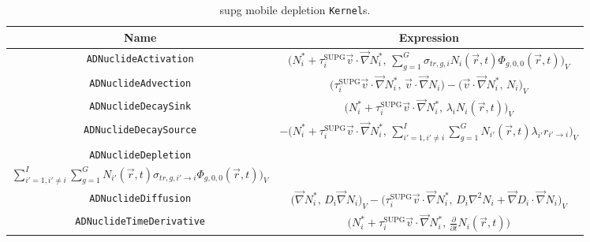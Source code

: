 \begin{table}[H]
    \centering
    \caption{\acrshort{supg} mobile depletion \texttt{Kernel}s.}
    \begin{tabular}{|c|c|}
        \hline
        \textbf{Name} & \textbf{Expression}\\
        \hline
        \texttt{ADNuclideActivation} & $\Bigg(N^{*}_{i} + \tau^{\text{SUPG}}_{i}\vec{v}\cdot\vec{\nabla}N^{*}_{i},\,\sum_{g = 1}^{G}\sigma_{tr,g,i}N_{i}(\vec{r},t)\Phi_{g, 0, 0}(\vec{r},t)\Bigg)_{V}$ \\
        \texttt{ADNuclideAdvection} & $\Bigg(\tau_{i}^{\text{SUPG}}\vec{v}\cdot\vec{\nabla}N^{*}_{i},\,\vec{v}\cdot\vec{\nabla}N_{i}\Bigg) - \Bigg(\vec{v}\cdot\vec{\nabla}N_{i}^{*},\,N_{i}\Bigg)_{V}$ \\
        \texttt{ADNuclideDecaySink} & $\Bigg(N^{*}_{i} + \tau^{\text{SUPG}}_{i}\vec{v}\cdot\vec{\nabla}N^{*}_{i},\,\lambda_{i}N_{i}(\vec{r},t)\Bigg)_{V}$ \\
        \texttt{ADNuclideDecaySource} & $-\Bigg(N^{*}_{i} + \tau^{\text{SUPG}}_{i}\vec{v}\cdot\vec{\nabla}N^{*}_{i},\,\sum_{i' = 1,i' \neq i}^{I}\sum_{g = 1}^{G}N_{i'}(\vec{r},t)\lambda_{i'}r_{i'\rightarrow i}\Bigg)_{V}$ \\
        \texttt{ADNuclideDepletion} & \makecell{$-\Bigg(N^{*}_{i} + \tau^{\text{SUPG}}_{i}\vec{v}\cdot\vec{\nabla}N^{*}_{i},$ \\ $\sum_{i' = 1,i' \neq i}^{I}\sum_{g = 1}^{G}N_{i'}(\vec{r},t)\sigma_{tr,g,i'\rightarrow i}\Phi_{g, 0, 0}(\vec{r},t)\Bigg)_{V}$} \\
        \texttt{ADNuclideDiffusion} & $\Bigg(\vec{\nabla}N_{i}^{*},\,D_{i}\vec{\nabla}N_{i}\Bigg)_{V} - \Bigg(\tau_{i}^{\text{SUPG}}\vec{v}\cdot\vec{\nabla}N^{*}_{i},\,D_{i}\nabla^{2}N_{i} + \vec{\nabla}D_{i}\cdot\vec{\nabla}N_{i}\Bigg)_{V}$ \\
        \texttt{ADNuclideTimeDerivative} & $\Bigg(N^{*}_{i} + \tau^{\text{SUPG}}_{i}\vec{v}\cdot\vec{\nabla}N^{*}_{i},\,\frac{\partial}{\partial t}N_{i}(\vec{r},t)\Bigg)$ \\
        \hline
    \end{tabular}
    \label{table:supg_dep_kernels}
\end{table}

